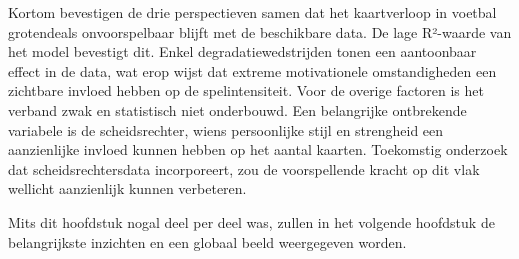 \vspace{5pt}

Kortom bevestigen de drie perspectieven samen dat het kaartverloop in voetbal grotendeals onvoorspelbaar blijft met de beschikbare data.
De lage R²-waarde van het model bevestigt dit.
Enkel degradatiewedstrijden tonen een aantoonbaar effect in de data, wat erop wijst dat extreme motivationele omstandigheden een zichtbare invloed hebben op de spelintensiteit.
Voor de overige factoren is het verband zwak en statistisch niet onderbouwd.
Een belangrijke ontbrekende variabele is de scheidsrechter, wiens persoonlijke stijl en strengheid een aanzienlijke invloed kunnen hebben op het aantal kaarten.
Toekomstig onderzoek dat scheidsrechtersdata incorporeert, zou de voorspellende kracht op dit vlak wellicht aanzienlijk kunnen verbeteren.

\vspace{5pt}

Mits dit hoofdstuk nogal deel per deel was, zullen in het volgende hoofdstuk de belangrijkste inzichten en een globaal beeld weergegeven worden.